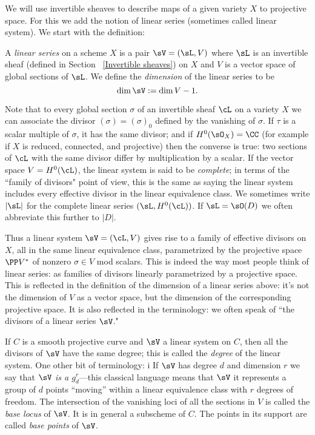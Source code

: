 We will use invertible sheaves to  describe maps of a given variety $X$ to projective space. For this we add the notion of linear series (sometimes called linear system). We start with the definition:

\begin{definition}
 A \emph{linear series} on a scheme $X$ is a pair $\sV  = (\sL, V)$ where $\sL$ is an invertible sheaf (defined in Section ~\ref{Invertible sheaves}) on $X$ and
 $V$ is a vector space of global sections of $\sL$. We define the \emph{dimension} of the linear series to be 
 $$
 \dim \sV := \dim V -1.
 $$
 
 Note that to every global section $\sigma$ of an invertible sheaf $\cL$ on a variety $X$  we can associate the divisor $(\sigma) = (\sigma)_0$ defined by the vanishing of $\sigma$. If $\tau$ is a scalar multiple of $\sigma$, it has the same divisor; and if 
 $H^0(\sO_X) = \CC$ (for example if $X$ is reduced, connected, and
 projective) then the converse is true: two sections of $\cL$ with the same divisor differ by multiplication by a scalar.  If the vector space $V = H^0(\cL)$, the linear system is said to be \emph{complete}; in terms of the ``family of divisors" point of view, this is the same as saying the linear system includes every effective divisor in the linear equivalence class. We sometimes write
 $|\sL|$ for the complete linear series $(\sL, H^0(\cL))$. If $\sL = \sO(D)$ we often abbreviate this further to $|D|$.

Thus a linear system $\sV = (\cL, V)$ gives rise to a family of effective divisors on $X$, all in the same linear equivalence class, parametrized by the projective space $\PP V^*$ of nonzero $\sigma \in V$ mod scalars. This is indeed the way most people think of linear series: as families of divisors linearly parametrized by a projective space. This is reflected in the definition of the dimension of a linear series above: it's not the dimension of $V$ as a vector space, but the dimension of the corresponding projective space. It is also reflected in the terminology: we often speak of ``the divisors of a linear series $\sV$." 
 
 If $C$ is a smooth projective curve and $\sV$ a linear system on $C$, then all the divisors of $\sV$ have the same degree; this is called the \emph{degree} of the linear system. One other bit of terminology: i 
If $\sV$ has degree $d$ and dimension $r$ we say that \emph{$\sV$ is a $g^r_d$}---this classical  language means that $\sV$ it represents a group of $d$ points ``moving'' within a linear equivalence class with $r$ degrees of freedom.  The intersection of the vanishing loci of all the sections in $V$ is called the \emph{base locus} of $\sV$. It is in general a subscheme of $C$. The points in its support are called \emph{base points} of $\sV$. 
 \end{definition}

